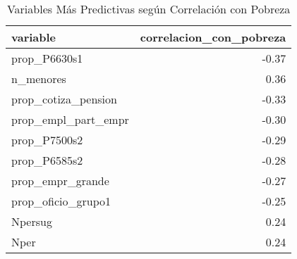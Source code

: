 \begin{table}[ht]
\centering
\begin{tabular}{lr}
  \toprule
variable & correlacion\_con\_pobreza \\ 
  \midrule
prop\_P6630s1 & -0.37 \\ 
  n\_menores & 0.36 \\ 
  prop\_cotiza\_pension & -0.33 \\ 
  prop\_empl\_part\_empr & -0.30 \\ 
  prop\_P7500s2 & -0.29 \\ 
  prop\_P6585s2 & -0.28 \\ 
  prop\_empr\_grande & -0.27 \\ 
  prop\_oficio\_grupo1 & -0.25 \\ 
  Npersug & 0.24 \\ 
  Nper & 0.24 \\ 
   \bottomrule
\end{tabular}
\caption{Variables Más Predictivas según Correlación con Pobreza} 
\label{tab:top_predictors}
\end{table}
